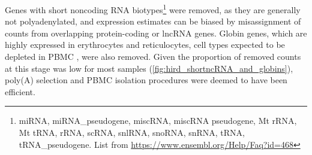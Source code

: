 

Genes with short noncoding RNA biotypes\footnote{miRNA, miRNA\_pseudogene, miscRNA, miscRNA pseudogene, Mt rRNA, Mt tRNA, rRNA, scRNA, snlRNA, snoRNA, snRNA, tRNA, tRNA\_pseudogene. List from \url{https://www.ensembl.org/Help/Faq?id=468}} were removed, as they are generally not polyadenylated, and expression estimates can be biased by misassignment of counts from overlapping protein-coding or lncRNA genes\autocite{zhao2018EvaluationTwoMain}.
Globin genes, which are highly expressed in erythrocytes and reticulocytes, cell types expected to be depleted in \gls{PBMC} \autocite{min2010VariabilityGeneExpression}, were also removed.
Given the proportion of removed counts at this stage was low for most samples (\cref{fig:hird_shortncRNA_and_globins}), poly(A) selection and \gls{PBMC} isolation procedures were deemed to have been efficient.


